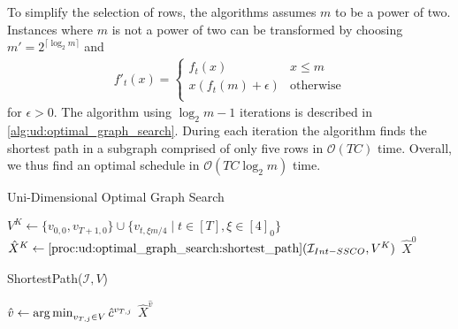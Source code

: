 To simplify the selection of rows, the algorithms assumes $m$ to be a power of two. Instances where $m$ is not a power of two can be transformed by choosing $m' = 2^{\lceil \log_2 m \rceil}$ and \begin{align*}
    f'_t(x) = \begin{cases}
        f_t(x) & x \leq m \\
        x (f_t(m) + \epsilon) & \text{otherwise} \\
    \end{cases}
\end{align*} for $\epsilon > 0$. The algorithm using $\log_2 m - 1$ iterations is described in \autoref{alg:ud:optimal_graph_search}. During each iteration the algorithm finds the shortest path in a subgraph comprised of only five rows in $\mathcal{O}(T C)$ time. Overall, we thus find an optimal schedule in $\mathcal{O}(T C \log_2 m)$ time.

\begin{algorithm}
    \caption{Uni-Dimensional Optimal Graph Search \cite{Albers2018}}\label{alg:ud:optimal_graph_search}
    $V^K \gets \{v_{0,0}, v_{T+1,0}\} \cup \{v_{t,\xi m / 4} \mid t \in [T], \xi \in [4]_0\}$\;
    $\hat{X}^K \gets \text{\ref{proc:ud:optimal_graph_search:shortest_path}}(\mathcal{I}_{Int-SSCO}, V^K)$\;
    \Return $\hat{X}^0$\;
\end{algorithm}

\begin{function}
	\caption{ShortestPath($\mathcal{I}, V$)}\label{proc:ud:optimal_graph_search:shortest_path}
    $\hat{v} \gets \operatorname*{arg\,min}_{v_{T,j} \in V} \hat{c}^{v_{T,j}}$\;
	\Return $\hat{X}^{\hat{v}}$\;
\end{function}

